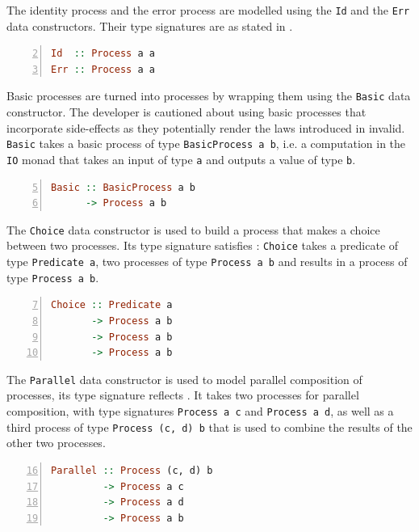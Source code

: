 The identity process and the error process are modelled using the \texttt{Id} and the \texttt{Err} data constructors. Their type signatures are as stated in .
\begin{lstlisting}[language=Haskell,caption=Data constructors for the id and error process.,label=fig:local_datatypes,numbers=left,frame=bt,firstnumber=2]
Id  :: Process a a
Err :: Process a a
\end{lstlisting}

Basic processes are turned into processes by wrapping them using the \texttt{Basic} data constructor. The developer is cautioned about using basic processes that incorporate side-effects as they potentially render the laws introduced in  invalid. \texttt{Basic} takes a basic process of type \texttt{BasicProcess a b}, i.e. a computation in the \texttt{IO} monad that takes an input of type \texttt{a} and outputs a value of type \texttt{b}.
\begin{lstlisting}[language=Haskell,caption=Signature of the \texttt{Simple} data constructor.,numbers=left,frame=bt,firstnumber=5]
Basic :: BasicProcess a b
      -> Process a b
\end{lstlisting}

The \texttt{Choice} data constructor is used to build a process that makes a choice between two processes. Its type signature satisfies : \texttt{Choice} takes a predicate of type \texttt{Predicate a}, two processes of type \texttt{Process a b} and results in a process of type \texttt{Process a b}.
\begin{lstlisting}[language=Haskell,caption=Signature of the \texttt{Choice} data constructor.,numbers=left,frame=bt,firstnumber=7]
Choice :: Predicate a
       -> Process a b
       -> Process a b
       -> Process a b
\end{lstlisting}

The \texttt{Parallel} data constructor is used to model parallel composition of processes, its type signature reflects . It takes two processes for parallel composition, with type signatures \texttt{Process a c} and \texttt{Process a d}, as well as a third process of type \texttt{Process (c, d) b} that is used to combine the results of the other two processes.
\begin{lstlisting}[language=Haskell,caption=Signature of the \texttt{Parallel} data constructor.,numbers=left,frame=bt,firstnumber=16]
Parallel :: Process (c, d) b
         -> Process a c
         -> Process a d
         -> Process a b
\end{lstlisting}

